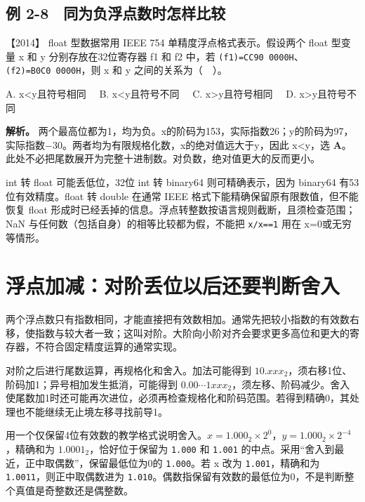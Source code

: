 \subsection{例 2-8　同为负浮点数时怎样比较}\label{co-ex2-8}

\noindent{}【2014】 float 型数据常用 IEEE 754 单精度浮点格式表示。假设两个 float 型变量 x 和 y 分别存放在32位寄存器 f1 和 f2 中，若 \allowbreak{}\texttt{(f1)=CC90\ 0000H}、\allowbreak{}\texttt{(f2)=B0C0\ 0000H}，则 x 和 y 之间的关系为（　）。

A. x\textless y且符号相同　 B. x\textless y且符号不同　 C. x\textgreater y且符号相同　 D. x\textgreater y且符号不同


\textbf{解析。} 两个最高位都为1，均为负。x的阶码为153，实际指数26；y的阶码为97，实际指数−30。两者均为有限规格化数，x的绝对值远大于y，因此 x\textless y，选 \textbf{A}。此处不必把尾数展开为完整十进制数。对负数，绝对值更大的反而更小。

int 转 float 可能丢低位，32位 int 转 binary64 则可精确表示，因为 binary64 有53位有效精度。float 转 double 在通常 IEEE 格式下能精确保留原有限数值，但不能恢复 float 形成时已经丢掉的信息。浮点转整数按语言规则截断，且须检查范围；NaN 与任何数（包括自身）的相等比较都为假，不能把 \allowbreak{}\texttt{x/x==1} 用在 x=0或无穷等情形。

\section{浮点加减：对阶丢位以后还要判断舍入}\label{co-02-08}

两个浮点数只有指数相同，才能直接把有效数相加。通常先把较小指数的有效数右移，使指数与较大者一致；这叫对阶。大阶向小阶对齐会要求更多高位和更大的寄存器，不符合固定精度运算的通常实现。

对阶之后进行尾数运算，再规格化和舍入。加法可能得到 \(10.xxx_2\)，须右移1位、阶码加1；异号相加发生抵消，可能得到 \(0.00\cdots1xxx_2\)，须左移、阶码减少。舍入使尾数加1时还可能再次进位，必须再检查规格化和阶码范围。若得到精确0，其处理也不能继续无止境左移寻找前导1。

用一个仅保留4位有效数的教学格式说明舍入。\(x=1.000_2\times2^0\)，\(y=1.000_2\times2^{-4}\)，精确和为 \(1.0001_2\)，恰好位于保留为 \allowbreak{}\texttt{1.000} 和 \allowbreak{}\texttt{1.001} 的中点。采用``舍入到最近，正中取偶数''，保留最低位为0的 \allowbreak{}\texttt{1.000}。若 x 改为 \allowbreak{}\texttt{1.001}，精确和为 \allowbreak{}\texttt{1.0011}，则正中取偶数进为 \allowbreak{}\texttt{1.010}。偶数指保留有效数的最低位为0，不是判断整个真值是奇整数还是偶整数。

